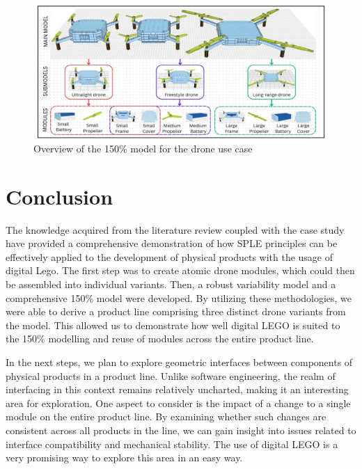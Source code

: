 \documentclass[sigconf,review]{acmart}
\begin{document}
\begin{figure}[htbp]
    \includegraphics[width=\textwidth]{./150_MODEL_8.jpg}
    \caption{Overview of the 150\% model for the drone use case}
    \label{fig:150-model}
\end{figure}

\section{Conclusion}
\label{sec:conclusion}

The knowledge acquired from the literature review coupled with the case study have provided a comprehensive demonstration of how SPLE principles can be effectively applied to the development of physical products with the usage of digital Lego. 
The first step was to create atomic drone modules, which could then be assembled into individual variants. 
Then, a robust variability model and a comprehensive 150\% model were developed. 
By utilizing these methodologies, we were able to derive a product line comprising three distinct drone variants from the model. 
This allowed us to demonstrate how well digital LEGO is suited to the 150\% modelling and reuse of modules across the entire product line.

In the next steps, we plan to explore geometric interfaces between components of physical products in a product line. Unlike software engineering, the realm of interfacing in this context remains relatively uncharted, making it an interesting area for exploration. 
One aspect to consider is the impact of a change to a single module on the entire product line. 
By examining whether such changes are consistent across all products in the line, we can gain insight into issues related to interface compatibility and mechanical stability. 
The use of digital LEGO is a very promising way to explore this area in an easy way.

\cite{Hackenberg_2023} \cite{Hackenberg_2025}



\end{document}
